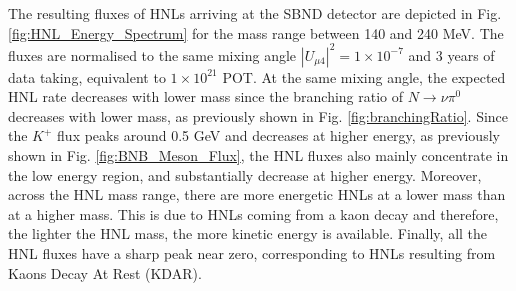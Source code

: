 The resulting fluxes of HNLs arriving at the SBND detector are depicted in Fig. \ref{fig:HNL_Energy_Spectrum} for the mass range between 140 and 240 MeV.
The fluxes are normalised to the same mixing angle $|U_{\mu4}|^{2} = 1 \times 10^{-7}$ and 3 years of data taking, equivalent to $1 \times 10^{21}$ POT.
At the same mixing angle, the expected HNL rate decreases with lower mass since the branching ratio of $N \rightarrow \nu\pi^0$ decreases with lower mass, as previously shown in Fig. \ref{fig:branchingRatio}.
Since the $K^{+}$ flux peaks around 0.5 GeV and decreases at higher energy, as previously shown in Fig. \ref{fig:BNB_Meson_Flux}, the HNL fluxes also mainly concentrate in the low energy region, and substantially decrease at higher energy. 
Moreover, across the HNL mass range, there are more energetic HNLs at a lower mass than at a higher mass.
This is due to HNLs coming from a kaon decay and therefore, the lighter the HNL mass, the more kinetic energy is available.
Finally, all the HNL fluxes have a sharp peak near zero, corresponding to HNLs resulting from Kaons Decay At Rest (KDAR).

